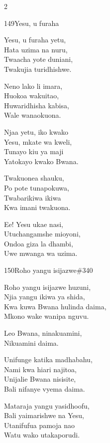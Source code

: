 \begin{multicols}{2}
\begin{hymn}{149}{Yesu, u furaha}{}
\begin{stanza}
Yesu, u furaha yetu,\\
Hata uzima na nuru,\\
Twaacha yote duniani,\\
Twakujia turidhishwe.
\end{stanza}
\begin{stanza}
Neno lako li imara,\\
Huokoa wakuitao,\\
Huwaridhisha kabisa,\\
Wale wanaokuona.
\end{stanza}
\begin{stanza}
Njaa yetu, iko kwako\\
Yesu, mkate wa kweli,\\
Tunayo kiu ya maji\\
Yatokayo kwako Bwana.
\end{stanza}
\begin{stanza}
Twakuonea shauku,\\
Po pote tunapokuwa,\\
Twabarikiwa ikiwa\\
Kwa imani twakuona.
\end{stanza}
\begin{stanza}
Ee! Yesu ukae nasi,\\
Utuchangamshe mioyoni,\\
Ondoa giza la dhambi,\\
Uwe mwanga wa uzima.
\end{stanza}
\end{hymn}

\begin{hymn}{150}{Roho yangu isijazwe}{\#340}
\begin{stanza}
Roho yangu isijazwe huzuni,\\
Njia yangu ikiwa ya shida,\\
Kwa kuwa Bwana hulinda daima,\\
Mkono wake wanipa nguvu.
\end{stanza}
\begin{chorus}
Leo Bwana, ninakuamini,\\
Nikuamini daima.
\end{chorus}
\begin{stanza}
Unifunge katika madhabahu,\\
Nami kwa hiari najitoa,\\
Unijalie Bwana nisisite,\\
Bali nifanye vyema daima.
\end{stanza}
\begin{stanza}
Mataraja yangu yasidhoofu,\\
Bali yaimarishwe na Yesu,\\
Utanifufua pamoja nao\\
Watu wako utakaporudi.
\end{stanza}
\end{hymn}


\end{multicols}
